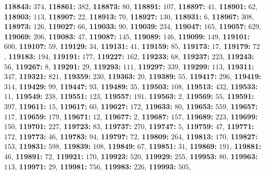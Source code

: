 \textsf{\bfseries 118843:} $374$, \textsf{\bfseries 118861:} $382$, \textsf{\bfseries 118873:} $80$, \textsf{\bfseries 118891:} $107$, \textsf{\bfseries 118897:} $41$, \textsf{\bfseries 118901:} $62$, \textsf{\bfseries 118903:} $113$, \textsf{\bfseries 118907:} $22$, \textsf{\bfseries 118913:} $70$, \textsf{\bfseries 118927:} $130$, \textsf{\bfseries 118931:} $6$, \textsf{\bfseries 118967:} $308$, \textsf{\bfseries 118973:} $126$, \textsf{\bfseries 119027:} $66$, \textsf{\bfseries 119033:} $90$, \textsf{\bfseries 119039:} $234$, \textsf{\bfseries 119047:} $165$, \textsf{\bfseries 119057:} $629$, \textsf{\bfseries 119069:} $206$, \textsf{\bfseries 119083:} $47$, \textsf{\bfseries 119087:} $145$, \textsf{\bfseries 119089:} $146$, \textsf{\bfseries 119099:} $149$, \textsf{\bfseries 119101:} $600$, \textsf{\bfseries 119107:} $59$, \textsf{\bfseries 119129:} $34$, \textsf{\bfseries 119131:} $41$, \textsf{\bfseries 119159:} $85$, \textsf{\bfseries 119173:} $17$, \textsf{\bfseries 119179:} $72$, \textsf{\bfseries 119183:} $194$, \textsf{\bfseries 119191:} $177$, \textsf{\bfseries 119227:} $162$, \textsf{\bfseries 119233:} $68$, \textsf{\bfseries 119237:} $223$, \textsf{\bfseries 119243:} $56$, \textsf{\bfseries 119267:} $8$, \textsf{\bfseries 119291:} $29$, \textsf{\bfseries 119293:} $111$, \textsf{\bfseries 119297:} $339$, \textsf{\bfseries 119299:} $113$, \textsf{\bfseries 119311:} $347$, \textsf{\bfseries 119321:} $821$, \textsf{\bfseries 119359:} $230$, \textsf{\bfseries 119363:} $20$, \textsf{\bfseries 119389:} $55$, \textsf{\bfseries 119417:} $296$, \textsf{\bfseries 119419:} $314$, \textsf{\bfseries 119429:} $99$, \textsf{\bfseries 119447:} $93$, \textsf{\bfseries 119489:} $35$, \textsf{\bfseries 119503:} $108$, \textsf{\bfseries 119513:} $432$, \textsf{\bfseries 119533:} $11$, \textsf{\bfseries 119549:} $238$, \textsf{\bfseries 119551:} $123$, \textsf{\bfseries 119557:} $191$, \textsf{\bfseries 119563:} $2$, \textsf{\bfseries 119569:} $55$, \textsf{\bfseries 119591:} $397$, \textsf{\bfseries 119611:} $15$, \textsf{\bfseries 119617:} $60$, \textsf{\bfseries 119627:} $172$, \textsf{\bfseries 119633:} $80$, \textsf{\bfseries 119653:} $559$, \textsf{\bfseries 119657:} $117$, \textsf{\bfseries 119659:} $179$, \textsf{\bfseries 119671:} $12$, \textsf{\bfseries 119677:} $2$, \textsf{\bfseries 119687:} $157$, \textsf{\bfseries 119689:} $223$, \textsf{\bfseries 119699:} $150$, \textsf{\bfseries 119701:} $227$, \textsf{\bfseries 119723:} $83$, \textsf{\bfseries 119737:} $270$, \textsf{\bfseries 119747:} $5$, \textsf{\bfseries 119759:} $47$, \textsf{\bfseries 119771:} $172$, \textsf{\bfseries 119773:} $46$, \textsf{\bfseries 119783:} $94$, \textsf{\bfseries 119797:} $72$, \textsf{\bfseries 119809:} $264$, \textsf{\bfseries 119813:} $170$, \textsf{\bfseries 119827:} $153$, \textsf{\bfseries 119831:} $598$, \textsf{\bfseries 119839:} $108$, \textsf{\bfseries 119849:} $67$, \textsf{\bfseries 119851:} $31$, \textsf{\bfseries 119869:} $191$, \textsf{\bfseries 119881:} $46$, \textsf{\bfseries 119891:} $72$, \textsf{\bfseries 119921:} $170$, \textsf{\bfseries 119923:} $520$, \textsf{\bfseries 119929:} $255$, \textsf{\bfseries 119953:} $80$, \textsf{\bfseries 119963:} $113$, \textsf{\bfseries 119971:} $29$, \textsf{\bfseries 119981:} $756$, \textsf{\bfseries 119983:} $226$, \textsf{\bfseries 119993:} $505$, 
